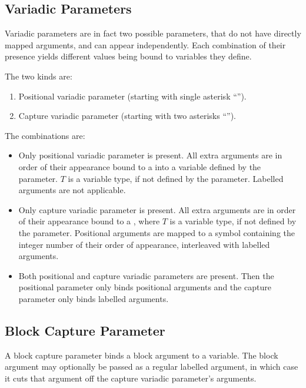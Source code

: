 \subsection{Variadic Parameters}
\label{sec:variadic-parameters}

Variadic parameters are in fact two possible parameters, that do not have directly mapped arguments, and can appear independently. Each combination of their presence yields different values being bound to variables they define. 

The two kinds are:
\begin{enumerate}
  \item Positional variadic parameter (starting with single asterisk ``\code{*}''). 
  \item Capture variadic parameter (starting with two asterisks ``\code{**}''). 
\end{enumerate}

The combinations are:
\begin{itemize}
  \item Only positional variadic parameter is present. All extra arguments are in order of their appearance bound to a  into a variable defined by the parameter. $T$ is a variable type, if not defined by the parameter. Labelled arguments are not applicable. 
  \item Only capture variadic parameter is present. All extra arguments are in order of their appearance bound to a , where $T$ is a variable type, if not defined by the parameter. Positional arguments are mapped to a symbol containing the integer number of their order of appearance, interleaved with labelled arguments. 
  \item Both positional and capture variadic parameters are present. Then the positional parameter only binds positional arguments and the capture parameter only binds labelled arguments. 
\end{itemize}





\subsection{Block Capture Parameter}
\label{sec:block-capture-parameter}

A block capture parameter binds a block argument to a variable. The block argument may optionally be passed as a regular labelled argument, in which case it cuts that argument off the capture variadic parameter's arguments. 





